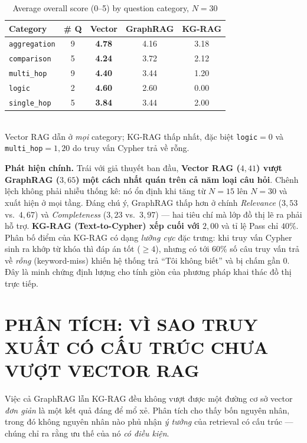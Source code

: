 \documentclass[conference]{IEEEtran}
\begin{document}
\begin{table}[!t]
\caption{Average overall score (0--5) by question category, $N=30$}
\label{tab:bycat}
\centering
\footnotesize
\begin{tabular}{@{}l c c c c@{}}
\toprule
\textbf{Category} & \textbf{\# Q} & \textbf{Vector} & \textbf{GraphRAG} & \textbf{KG-RAG} \\
\midrule
\texttt{aggregation} & 9 & \textbf{4.78} & 4.16 & 3.18 \\
\texttt{comparison}  & 5 & \textbf{4.24} & 3.72 & 2.12 \\
\texttt{multi\_hop}  & 9 & \textbf{4.40} & 3.44 & 1.20 \\
\texttt{logic}       & 2 & \textbf{4.60} & 2.60 & 0.00 \\
\texttt{single\_hop} & 5 & \textbf{3.84} & 3.44 & 2.00 \\
\bottomrule
\end{tabular}
\\[2pt]
{\scriptsize Vector RAG dẫn ở \emph{mọi} category; KG-RAG thấp nhất, đặc biệt \texttt{logic}$=0$ và \texttt{multi\_hop}$=1{,}20$ do truy vấn Cypher trả về rỗng.}
\end{table}

\textbf{Phát hiện chính.} Trái với giả thuyết ban đầu, \textbf{Vector RAG ($4{,}41$) vượt GraphRAG ($3{,}65$) một cách nhất quán trên cả năm loại câu hỏi}. Chênh lệch không phải nhiễu thống kê: nó ổn định khi tăng từ $N=15$ lên $N=30$ và xuất hiện ở mọi tầng. Đáng chú ý, GraphRAG thấp hơn ở chính \emph{Relevance} ($3{,}53$ vs.\ $4{,}67$) và \emph{Completeness} ($3{,}23$ vs.\ $3{,}97$) --- hai tiêu chí mà lớp đồ thị lẽ ra phải hỗ trợ. \textbf{KG-RAG (Text-to-Cypher) xếp cuối với $2{,}00$} và tỉ lệ Pass chỉ $40\%$. Phân bố điểm của KG-RAG có dạng \emph{lưỡng cực} đặc trưng: khi truy vấn Cypher sinh ra khớp từ khóa thì đáp án tốt ($\geq 4$), nhưng có tới $60\%$ số câu truy vấn trả về \emph{rỗng} (keyword-miss) khiến hệ thống trả ``Tôi không biết'' và bị chấm gần $0$. Đây là minh chứng định lượng cho tính giòn của phương pháp khai thác đồ thị trực tiếp.

\section{PHÂN TÍCH: VÌ SAO TRUY XUẤT CÓ CẤU TRÚC CHƯA VƯỢT VECTOR RAG}\label{sec:why}
Việc cả GraphRAG lẫn KG-RAG đều không vượt được một đường cơ sở vector \emph{đơn giản} là một kết quả đáng để mổ xẻ. Phân tích cho thấy bốn nguyên nhân, trong đó không nguyên nhân nào phủ nhận \emph{ý tưởng} của retrieval có cấu trúc --- chúng chỉ ra rằng ưu thế của nó \emph{có điều kiện}.
\end{document}
